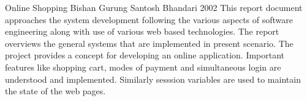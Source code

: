 \begin{conf-abstract}[]
{Online Shopping}
{ 
Bishan Gurung
Santosh Bhandari
}
{2002}
This report document approaches the system development following the various aspects of software engineering along with use of various web based technologies. The report overviews the general systems that are implemented in present scenario. The project provides a concept for developing an online application. Important features like shopping cart, modes of payment and simultaneous login are understood and implemented. Similarly sesssion variables are used to maintain the state of the web pages.
\end{conf-abstract}	